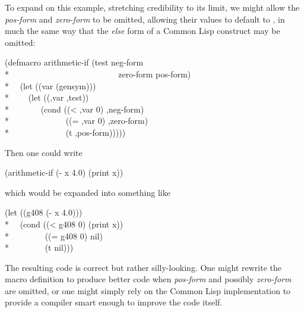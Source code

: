 \begin{defmac}
To expand on this example, stretching credibility to its limit,
we might allow the \emph{pos-form}
and \emph{zero-form} to be omitted, allowing their values to default to {\nil},
in much the same way that the \emph{else} form of a Common Lisp  construct
may be omitted:
\begin{lisp}
(defmacro arithmetic-if (test neg-form \\*
~~~~~~~~~~~~~~~~~~~~~~~~~ zero-form pos-form) \\*
~~(let ((var (gensym))) \\*
~~~~{\Xbq}(let ((,var ,test)) \\*
~~~~~~~(cond ((< ,var 0) ,neg-form) \\*
~~~~~~~~~~~~~((= ,var 0) ,zero-form) \\*
~~~~~~~~~~~~~(t ,pos-form)))))
\end{lisp}
Then one could write
\begin{lisp}
(arithmetic-if (- x 4.0) (print x))
\end{lisp}
which would be expanded into something like
\begin{lisp}
(let ((g408 (- x 4.0))) \\*
~~(cond ((< g408 0) (print x)) \\*
~~~~~~~~((= g408 0) nil) \\*
~~~~~~~~(t nil)))
\end{lisp}
The resulting code is correct but rather silly-looking.
One might rewrite the macro definition to produce better code
when \emph{pos-form} and possibly \emph{zero-form} are omitted,
or one might simply rely on the Common Lisp implementation to provide
a compiler smart enough to improve the code itself.


\end{defmac}
